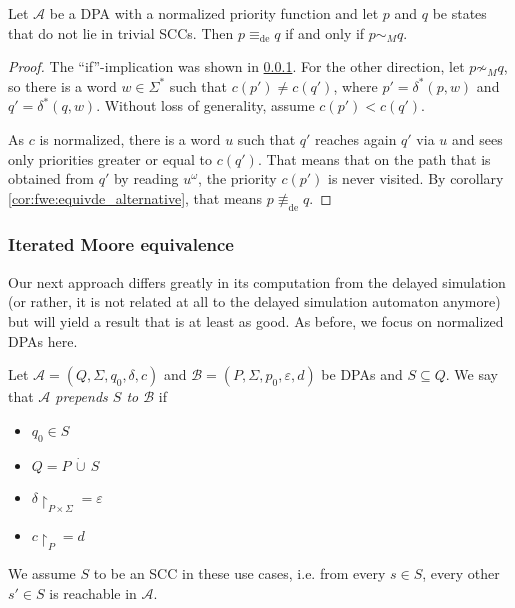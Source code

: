 \begin{lem}
	Let $\mathcal{A}$ be a DPA with a normalized priority function and let $p$ and $q$ be states that do not lie in trivial SCCs. Then $p \equiv_\text{de} q$ if and only if $p \sim_M q$.
\end{lem}

\begin{proof}
	The \enquote{if}-implication was shown in \ref{}. For the other direction, let $p \not\sim_M q$, so there is a word $w \in \Sigma^*$ such that $c(p') \neq c(q')$, where $p' = \delta^*(p, w)$ and $q' = \delta^*(q, w)$. Without loss of generality, assume $c(p') < c(q')$.
	
	As $c$ is normalized, there is a word $u$ such that $q'$ reaches again $q'$ via $u$ and sees only priorities greater or equal to $c(q')$. That means that on the path that is obtained from $q'$ by reading $u^\omega$, the priority $c(p')$ is never visited. By corollary \ref{cor:fwe:equivde_alternative}, that means $p \not\equiv_\text{de} q$.
\end{proof}


\subsubsection{Iterated Moore equivalence}
Our next approach differs greatly in its computation from the delayed simulation (or rather, it is not related at all to the delayed simulation automaton anymore) but will yield a result that is at least as good. As before, we focus on normalized DPAs here.

\begin{defn}
	Let $\mathcal{A} = (Q, \Sigma, q_0, \delta, c)$ and $\mathcal{B} = (P, \Sigma, p_0, \varepsilon, d)$ be DPAs and $S \subseteq Q$. We say that \emph{$\mathcal{A}$ prepends $S$ to $\mathcal{B}$} if 
	\begin{itemize}
		\item $q_0 \in S$
		\item $Q = P \,\dot{\cup}\, S$
		\item $\delta\upharpoonright_{P \times \Sigma} = \varepsilon$
		\item $c\upharpoonright_P = d$
	\end{itemize}
	
	We assume $S$ to be an SCC in these use cases, i.e. from every $s \in S$, every other $s' \in S$ is reachable in $\mathcal{A}$.
\end{defn} 

